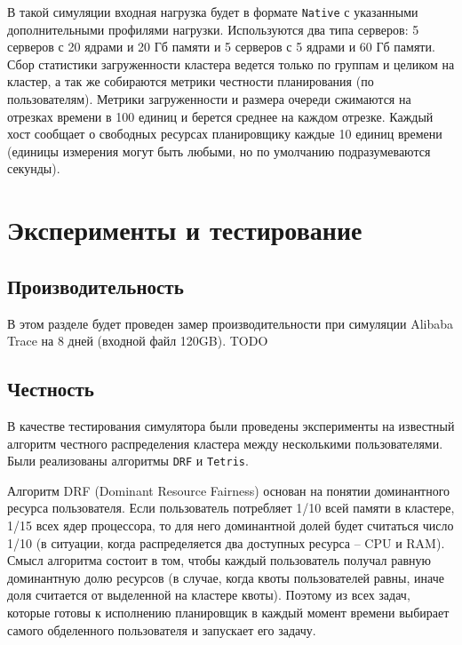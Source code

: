 В такой симуляции входная нагрузка будет в формате \texttt{Native} с указанными дополнительными профилями нагрузки. Используются два типа серверов: 5 серверов с 20 ядрами и 20 Гб памяти и 5 серверов с 5 ядрами и 60 Гб памяти. Сбор статистики загруженности кластера ведется только по группам и целиком на кластер, а так же собираются метрики честности планирования (по пользователям). Метрики загруженности и размера очереди сжимаются на отрезках времени в 100 единиц и берется среднее на каждом отрезке. Каждый хост сообщает о свободных ресурсах планировщику каждые 10 единиц времени (единицы измерения могут быть любыми, но по умолчанию подразумеваются секунды). 


\section{Эксперименты и тестирование}\label{sec:experiments}

\subsection{Производительность}

В этом разделе будет проведен замер производительности при симуляции Alibaba Trace на 8 дней (входной файл 120GB). TODO 

\subsection{Честность}\label{sec:example-fairness}

В качестве тестирования симулятора были проведены эксперименты на известный алгоритм честного распределения кластера между несколькими пользователями. Были реализованы алгоритмы \texttt{DRF}\cite{drf-article} и \texttt{Tetris}\cite{tetris-article}. 

Алгоритм DRF (Dominant Resource Fairness) основан на понятии доминантного ресурса пользователя. Если пользователь потребляет 1/10 всей памяти в кластере, 1/15 всех ядер процессора, то для него доминантной долей будет считаться число 1/10 (в ситуации, когда распределяется два доступных ресурса -- CPU и RAM). Смысл алгоритма состоит в том, чтобы каждый пользователь получал равную доминантную долю ресурсов (в случае, когда квоты пользователей равны, иначе доля считается от выделенной на кластере квоты). Поэтому из всех задач, которые готовы к исполнению планировщик в каждый момент времени выбирает самого обделенного пользователя и запускает его задачу. 

